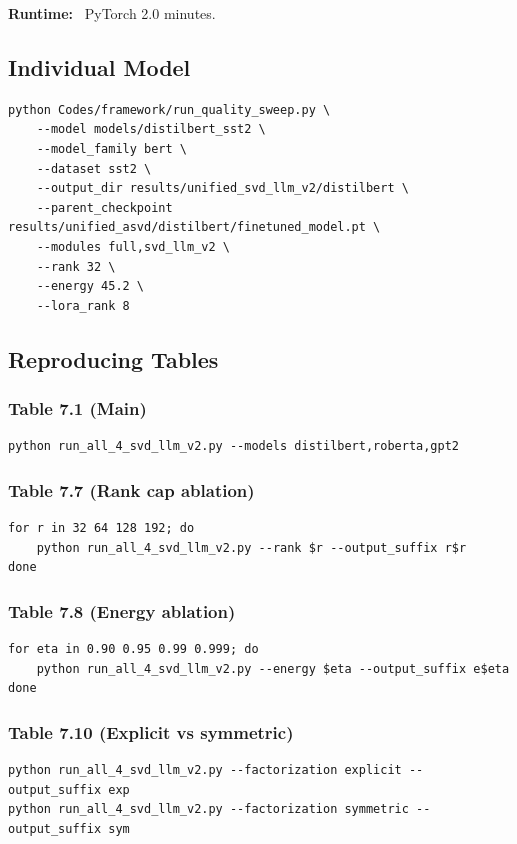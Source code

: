 \textbf{Runtime:} ~PyTorch 2.0 minutes.

\subsection{Individual Model}

\begin{lstlisting}
python Codes/framework/run_quality_sweep.py \
    --model models/distilbert_sst2 \
    --model_family bert \
    --dataset sst2 \
    --output_dir results/unified_svd_llm_v2/distilbert \
    --parent_checkpoint results/unified_asvd/distilbert/finetuned_model.pt \
    --modules full,svd_llm_v2 \
    --rank 32 \
    --energy 45.2 \
    --lora_rank 8
\end{lstlisting}

\subsection{Reproducing Tables}

\subsubsection{Table 7.1 (Main)}
\begin{lstlisting}
python run_all_4_svd_llm_v2.py --models distilbert,roberta,gpt2
\end{lstlisting}

\subsubsection{Table 7.7 (Rank cap ablation)}
\begin{lstlisting}
for r in 32 64 128 192; do
    python run_all_4_svd_llm_v2.py --rank $r --output_suffix r$r
done
\end{lstlisting}

\subsubsection{Table 7.8 (Energy ablation)}
\begin{lstlisting}
for eta in 0.90 0.95 0.99 0.999; do
    python run_all_4_svd_llm_v2.py --energy $eta --output_suffix e$eta
done
\end{lstlisting}

\subsubsection{Table 7.10 (Explicit vs symmetric)}
\begin{lstlisting}
python run_all_4_svd_llm_v2.py --factorization explicit --output_suffix exp
python run_all_4_svd_llm_v2.py --factorization symmetric --output_suffix sym
\end{lstlisting}

